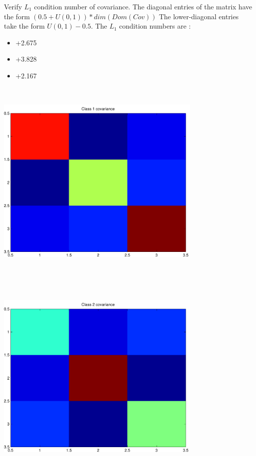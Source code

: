 \documentclass[12pt]{article}
\theoremstyle{definition}
\theoremstyle{remark}
\numberwithin{equation}{section}
\begin{document}
Verify $L_1$ condition number of covariance. The diagonal entries of the matrix have the form $(0.5 + U(0,1) )*dim(Dom(Cov))$
The lower-diagonal entries take the form $U(0,1) - 0.5$. 
The $L_1$ condition numbers are :
\begin{itemize}
\item +2.675
\item +3.828
\item +2.167
\end{itemize}
\includegraphics[width=10.0cm,height=10.0cm]{rv1_corr.pdf}

\includegraphics[width=10.0cm,height=10.0cm]{rv2_corr.pdf}
\end{document}
